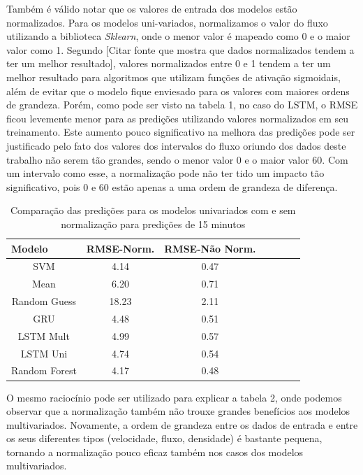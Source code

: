Também é válido notar que os valores de entrada dos modelos estão normalizados. Para os modelos uni-variados, normalizamos o valor do fluxo utilizando a biblioteca \textit{Sklearn}, onde o menor valor é mapeado como 0 e o maior valor como 1. Segundo [Citar fonte que mostra que dados normalizados tendem a ter um melhor resultado], valores normalizados entre 0 e 1 tendem a ter um melhor resultado para algoritmos que utilizam funções de ativação sigmoidais, além de evitar que o modelo fique enviesado para os valores com maiores ordens de grandeza. Porém, como pode ser visto na tabela 1, no caso do \acrfull{LSTM}, o \acrfull{RMSE} ficou levemente menor para as predições utilizando valores normalizados em seu treinamento. Este aumento pouco significativo na melhora das predições pode ser justificado pelo fato dos valores dos intervalos do fluxo oriundo dos dados deste trabalho não serem tão grandes, sendo o menor valor 0 e o maior valor 60. Com um intervalo como esse, a normalização pode não ter tido um impacto tão significativo, pois 0 e 60 estão apenas a uma ordem de grandeza de diferença.

\begin{table}[htbp]
    \caption{Comparação das predições para os modelos univariados com e sem normalização para predições de 15 minutos}
    \label{table:comp_rmse_uni_15}
    \begin{center}
    \begin{tabular}{ccccccc}
    \hline
    \multicolumn{1}{l}{\textbf{Modelo}} & \multicolumn{1}{l}{\textbf{RMSE-Norm.}} & \multicolumn{1}{l}{\textbf{RMSE-Não Norm.}}\\
    \hline
    SVM & 4.14 & 0.47  \\
    Mean & 6.20 & 0.71  \\
    Random Guess & 18.23 & 2.11\\
    GRU & 4.48 & 0.51  \\ 
    LSTM Mult & 4.99 &  0.57  \\ 
    LSTM Uni & 4.74 &  0.54  \\ 
    Random Forest & 4.17 & 0.48 \\
    \hline
    \end{tabular}
    \end{center}
\end{table}


O mesmo raciocínio pode ser utilizado para explicar a tabela 2, onde podemos observar que a normalização também não trouxe grandes benefícios aos modelos multivariados. Novamente, a ordem de grandeza entre os dados de entrada e entre os seus diferentes tipos (velocidade, fluxo, densidade) é bastante pequena, tornando a normalização pouco eficaz também nos casos dos modelos multivariados.

